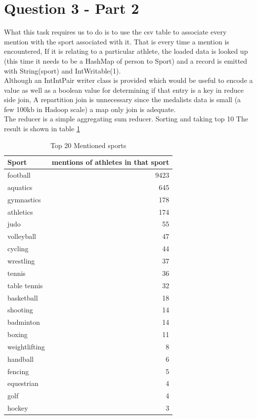 \documentclass[12pt]{article}
\begin{document}
\section{Question 3 - Part 2}
 
What this task requires us to do is to use the csv table to associate every mention with the sport associated with it. That is every time a mention is encountered, If it is relating to a particular athlete, the loaded data is looked up (this time it needs to be a HashMap of person to Sport) and a record is emitted with String(sport) and IntWritable(1). \\

Although an IntIntPair writer class is provided which would be useful to encode a value as well as a boolean value for determining if that entry is a key in reduce side join, A repartition join is unnecessary since the medalists data is small (a few 100kb in Hadoop scale) a map only join is adequate. \\

The reducer is a simple aggregating sum reducer. Sorting and taking top 10 The result is shown in table \ref{table:top_sports}\\
\begin{table}[ht]
\centering
\caption{Top 20 Mentioned sports}
\label{table:top_sports}
\begin{tabular}{ l r }
\hline
Sport & mentions of athletes in that sport \\
\hline
football &	9423 \\
aquatics &	645 \\
gymnastics &	178 \\
athletics &	174 \\
judo &	55 \\
volleyball &	47 \\
cycling &	44 \\
wrestling &	37 \\
tennis &	36 \\
table tennis &	32 \\
basketball &	18 \\
shooting &	14 \\
badminton &	14 \\
boxing &	11 \\
weightlifting &	8 \\
handball &	6 \\
fencing &	5 \\
equestrian &	4 \\
golf &	4 \\
hockey &	3 \\
\end{tabular}
\end{table}
\end{document}
